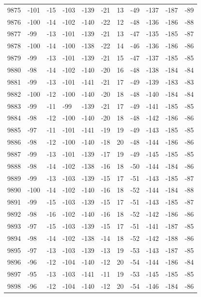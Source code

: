 \begin{table}[H]
\begin{tabular}{lllllllllll}
9875 & -101 & -15 & -103 & -139 & -21 & 13 & -49 & -137 & -187 & -89 \\
9876 & -100 & -14 & -102 & -140 & -22 & 12 & -48 & -136 & -186 & -88 \\
9877 & -99 & -13 & -101 & -139 & -21 & 13 & -47 & -135 & -185 & -87 \\
9878 & -100 & -14 & -100 & -138 & -22 & 14 & -46 & -136 & -186 & -86 \\
9879 & -99 & -13 & -101 & -139 & -21 & 15 & -47 & -137 & -185 & -85 \\
9880 & -98 & -14 & -102 & -140 & -20 & 16 & -48 & -138 & -184 & -84 \\
9881 & -99 & -13 & -101 & -141 & -21 & 17 & -49 & -139 & -183 & -83 \\
9882 & -100 & -12 & -100 & -140 & -20 & 18 & -48 & -140 & -184 & -84 \\
9883 & -99 & -11 & -99 & -139 & -21 & 17 & -49 & -141 & -185 & -85 \\
9884 & -98 & -12 & -100 & -140 & -20 & 18 & -48 & -142 & -186 & -86 \\
9885 & -97 & -11 & -101 & -141 & -19 & 19 & -49 & -143 & -185 & -85 \\
9886 & -98 & -12 & -100 & -140 & -18 & 20 & -48 & -144 & -186 & -86 \\
9887 & -99 & -13 & -101 & -139 & -17 & 19 & -49 & -145 & -185 & -85 \\
9888 & -98 & -14 & -102 & -138 & -16 & 18 & -50 & -144 & -184 & -86 \\
9889 & -99 & -13 & -103 & -139 & -15 & 17 & -51 & -143 & -185 & -87 \\
9890 & -100 & -14 & -102 & -140 & -16 & 18 & -52 & -144 & -184 & -88 \\
9891 & -99 & -15 & -103 & -139 & -15 & 17 & -51 & -143 & -185 & -87 \\
9892 & -98 & -16 & -102 & -140 & -16 & 18 & -52 & -142 & -186 & -86 \\
9893 & -97 & -15 & -103 & -139 & -15 & 17 & -51 & -141 & -187 & -85 \\
9894 & -98 & -14 & -102 & -138 & -14 & 18 & -52 & -142 & -188 & -86 \\
9895 & -97 & -13 & -103 & -139 & -13 & 19 & -53 & -143 & -187 & -85 \\
9896 & -96 & -12 & -104 & -140 & -12 & 20 & -54 & -144 & -186 & -84 \\
9897 & -95 & -13 & -103 & -141 & -11 & 19 & -53 & -145 & -185 & -85 \\
9898 & -96 & -12 & -104 & -140 & -12 & 20 & -54 & -146 & -184 & -86 \\

\end{tabular}
\end{table}
